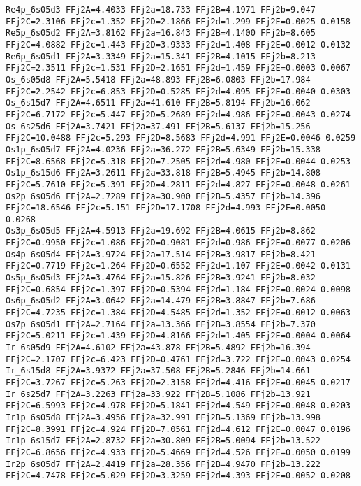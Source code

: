 {\begin{verbatim}
Re4p_6s05d3 FFj2A=4.4033 FFj2a=18.733 FFj2B=4.1971 FFj2b=9.047 FFj2C=2.3106 FFj2c=1.352 FFj2D=2.1866 FFj2d=1.299 FFj2E=0.0025 0.0158 
Re5p_6s05d2 FFj2A=3.8162 FFj2a=16.843 FFj2B=4.1400 FFj2b=8.605 FFj2C=4.0882 FFj2c=1.443 FFj2D=3.9333 FFj2d=1.408 FFj2E=0.0012 0.0132 
Re6p_6s05d1 FFj2A=3.3349 FFj2a=15.341 FFj2B=4.1015 FFj2b=8.213 FFj2C=2.3511 FFj2c=1.531 FFj2D=2.1651 FFj2d=1.459 FFj2E=0.0003 0.0067 
Os_6s05d8 FFj2A=5.5418 FFj2a=48.893 FFj2B=6.0803 FFj2b=17.984 FFj2C=2.2542 FFj2c=6.853 FFj2D=0.5285 FFj2d=4.095 FFj2E=0.0040 0.0303 
Os_6s15d7 FFj2A=4.6511 FFj2a=41.610 FFj2B=5.8194 FFj2b=16.062 FFj2C=6.7172 FFj2c=5.447 FFj2D=5.2689 FFj2d=4.986 FFj2E=0.0043 0.0274 
Os_6s25d6 FFj2A=3.7421 FFj2a=37.491 FFj2B=5.6137 FFj2b=15.256 FFj2C=10.0488 FFj2c=5.293 FFj2D=8.5683 FFj2d=4.991 FFj2E=0.0046 0.0259 
Os1p_6s05d7 FFj2A=4.0236 FFj2a=36.272 FFj2B=5.6349 FFj2b=15.338 FFj2C=8.6568 FFj2c=5.318 FFj2D=7.2505 FFj2d=4.980 FFj2E=0.0044 0.0253 
Os1p_6s15d6 FFj2A=3.2611 FFj2a=33.818 FFj2B=5.4945 FFj2b=14.808 FFj2C=5.7610 FFj2c=5.391 FFj2D=4.2811 FFj2d=4.827 FFj2E=0.0048 0.0261 
Os2p_6s05d6 FFj2A=2.7289 FFj2a=30.900 FFj2B=5.4357 FFj2b=14.396 FFj2C=18.6546 FFj2c=5.151 FFj2D=17.1708 FFj2d=4.993 FFj2E=0.0050 0.0268 
Os3p_6s05d5 FFj2A=4.5913 FFj2a=19.692 FFj2B=4.0615 FFj2b=8.862 FFj2C=0.9950 FFj2c=1.086 FFj2D=0.9081 FFj2d=0.986 FFj2E=0.0077 0.0206 
Os4p_6s05d4 FFj2A=3.9724 FFj2a=17.514 FFj2B=3.9817 FFj2b=8.421 FFj2C=0.7719 FFj2c=1.264 FFj2D=0.6552 FFj2d=1.107 FFj2E=0.0042 0.0131 
Os5p_6s05d3 FFj2A=3.4764 FFj2a=15.826 FFj2B=3.9241 FFj2b=8.032 FFj2C=0.6854 FFj2c=1.397 FFj2D=0.5394 FFj2d=1.184 FFj2E=0.0024 0.0098 
Os6p_6s05d2 FFj2A=3.0642 FFj2a=14.479 FFj2B=3.8847 FFj2b=7.686 FFj2C=4.7235 FFj2c=1.384 FFj2D=4.5485 FFj2d=1.352 FFj2E=0.0012 0.0063 
Os7p_6s05d1 FFj2A=2.7164 FFj2a=13.366 FFj2B=3.8554 FFj2b=7.370 FFj2C=5.0211 FFj2c=1.439 FFj2D=4.8166 FFj2d=1.405 FFj2E=0.0004 0.0064 
Ir_6s05d9 FFj2A=4.6102 FFj2a=43.878 FFj2B=5.4892 FFj2b=16.394 FFj2C=2.1707 FFj2c=6.423 FFj2D=0.4761 FFj2d=3.722 FFj2E=0.0043 0.0254 
Ir_6s15d8 FFj2A=3.9372 FFj2a=37.508 FFj2B=5.2846 FFj2b=14.661 FFj2C=3.7267 FFj2c=5.263 FFj2D=2.3158 FFj2d=4.416 FFj2E=0.0045 0.0217 
Ir_6s25d7 FFj2A=3.2263 FFj2a=33.922 FFj2B=5.1086 FFj2b=13.921 FFj2C=6.5993 FFj2c=4.978 FFj2D=5.1841 FFj2d=4.549 FFj2E=0.0048 0.0203 
Ir1p_6s05d8 FFj2A=3.4956 FFj2a=32.991 FFj2B=5.1369 FFj2b=13.998 FFj2C=8.3991 FFj2c=4.924 FFj2D=7.0561 FFj2d=4.612 FFj2E=0.0047 0.0196 
Ir1p_6s15d7 FFj2A=2.8732 FFj2a=30.809 FFj2B=5.0094 FFj2b=13.522 FFj2C=6.8656 FFj2c=4.933 FFj2D=5.4669 FFj2d=4.526 FFj2E=0.0050 0.0199 
Ir2p_6s05d7 FFj2A=2.4419 FFj2a=28.356 FFj2B=4.9470 FFj2b=13.222 FFj2C=4.7478 FFj2c=5.029 FFj2D=3.3259 FFj2d=4.393 FFj2E=0.0052 0.0208 

\end{verbatim}}
